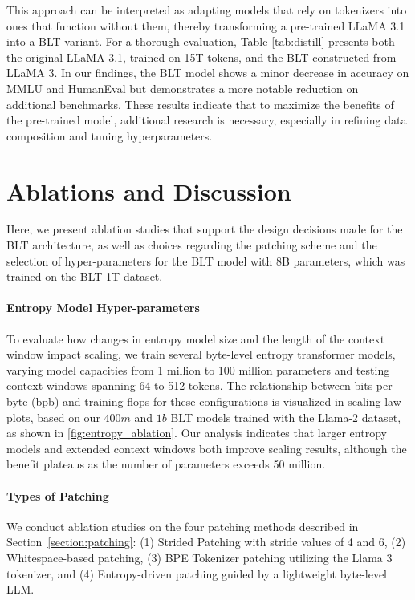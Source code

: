 This approach can be interpreted as adapting models that rely on tokenizers into ones that function without them, thereby transforming a pre-trained LLaMA 3.1 into a {\textsc BLT} variant. For a thorough evaluation, Table \ref{tab:distill} presents both the original LLaMA 3.1, trained on 15T tokens, and the {\textsc BLT} constructed from LLaMA 3. In our findings, the {\textsc BLT} model shows a minor decrease in accuracy on MMLU and HumanEval but demonstrates a more notable reduction on additional benchmarks. These results indicate that to maximize the benefits of the pre-trained model, additional research is necessary, especially in refining data composition and tuning hyperparameters.

\section{Ablations and Discussion}
\label{section:ablations}
Here, we present ablation studies that support the design decisions made for the {\textsc BLT} architecture, as well as choices regarding the patching scheme and the selection of hyper-parameters for the {\textsc BLT} model with 8B parameters, which was trained on the {\textsc BLT}-1T dataset.

\paragraph{Entropy Model Hyper-parameters} To evaluate how changes in entropy model size and the length of the context window impact scaling, we train several byte-level entropy transformer models, varying model capacities from 1 million to 100 million parameters and testing context windows spanning 64 to 512 tokens. The relationship between bits per byte (bpb) and training flops for these configurations is visualized in scaling law plots, based on our $400m$ and $1b$ {\textsc BLT} models trained with the Llama-2 dataset, as shown in \autoref{fig:entropy_ablation}. Our analysis indicates that larger entropy models and extended context windows both improve scaling results, although the benefit plateaus as the number of parameters exceeds 50 million.

\paragraph{Types of Patching}

We conduct ablation studies on the four patching methods described in Section~\ref{section:patching}: (1) Strided Patching with stride values of 4 and 6, (2) Whitespace-based patching, (3) BPE Tokenizer patching utilizing the Llama 3 tokenizer, and (4) Entropy-driven patching guided by a lightweight byte-level LLM.

